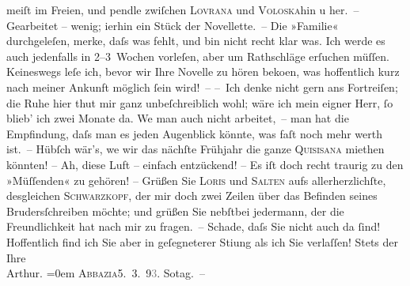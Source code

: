 \begin{ledgroupsized}[t]{13cm}
               meiſt im Freien, und pendle zwiſchen \textsc{Lovrana} und \textsc{Voloska}hin u her. – Gearbeitet – wenig; i{\geminationm}erhin ein Stück der Novellette. – Die »Familie« durchgeleſen, merke, daſs was fehlt, und bin nicht recht klar was.
               Ich werde es auch jedenfalls in 2–3 Wochen vorleſen, aber um Rathschläge erſuchen
               müſſen. Keineswegs leſe ich, bevor wir Ihre Novelle zu hören beko{\geminationm}en, was
               hoffentlich kurz nach meiner Ankunft möglich ſein wird! –\pend
           \pstart
           – Ich denke nicht gern ans Fortreiſen; die Ruhe hier thut mir ganz unbeſchreiblich
               wohl; wäre ich mein eigner Herr, ſo blieb’ ich zwei Monate da. We{\geminationn} man auch nicht {\pb}arbeitet, – man hat die Empfindung, daſs man es jeden Augenblick könnte, was faſt
               noch mehr werth ist. – Hübſch wär’s, we{\geminationn} wir das nächſte
               Frühjahr die ganze \textsc{Quisisana} miethen könnten! – Ah, diese Luft – einfach entzückend! – Es iſt doch recht
               traurig zu den »Müſſenden« zu gehören! –\pend
           \pstart
           Grüßen Sie \textsc{Loris} und \textsc{Salten} aufs allerherzlichſte, desgleichen \textsc{Schwarzkopf}, der mir doch zwei Zeilen über das Befinden seines Brudersſchreiben möchte; und grüßen Sie nebſtbei
               jedermann, der die Freundlichkeit hat nach mir zu fragen. – Schade, daſs {\pb}Sie nicht auch da ſind! Hoffentlich find ich Sie aber
               in geſegneterer Sti{\geminationm}ung als ich Sie verlaſſen!\pend
           \pstart
           Stets der Ihre{\\[\baselineskip]}\spacefill\mbox{Arthur.}\pend
           \leftskip=0em{}\pstart
           \textsc{Abbazia}5. 3. 9\textcolor{gray}{3}. So{\geminationn}tag. –\pend
           

\end{ledgroupsized}
